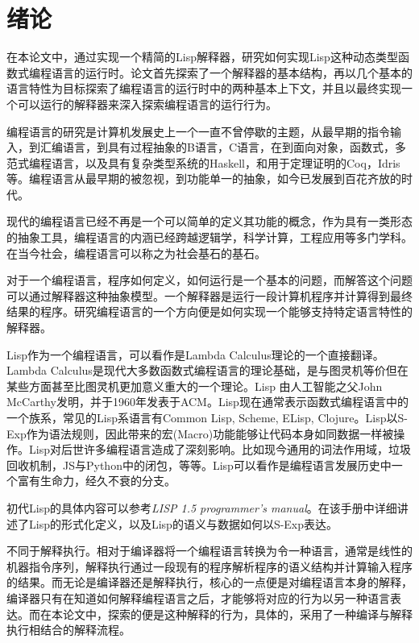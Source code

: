 %
%
{
    \let\centering\raggedright
    \chapter*{绪论}
}
\label{ch:intro}
\thispagestyle{hubu@thesis}

在本论文中，通过实现一个精简的Lisp解释器，研究如何实现Lisp这种动态类型函数式编程语言的运行时。论文首先探索了一个解释器的基本结构，再以几个基本的语言特性为目标探索了编程语言的运行时中的两种基本上下文，并且以最终实现一个可以运行的解释器来深入探索编程语言的运行行为。

编程语言的研究是计算机发展史上一个一直不曾停歇的主题，从最早期的指令输入，到汇编语言，到具有过程抽象的B语言，C语言，在到面向对象，函数式，多范式编程语言，以及具有复杂类型系统的Haskell，和用于定理证明的Coq，Idris等。编程语言从最早期的被忽视，到功能单一的抽象，如今已发展到百花齐放的时代。

现代的编程语言已经不再是一个可以简单的定义其功能的概念，作为具有一类形态的抽象工具，编程语言的内涵已经跨越逻辑学，科学计算，工程应用等多门学科。在当今社会，编程语言可以称之为社会基石的基石。

对于一个编程语言，程序如何定义，如何运行是一个基本的问题，而解答这个问题可以通过解释器这种抽象模型。一个解释器是运行一段计算机程序并计算得到最终结果的程序。研究编程语言的一个方向便是如何实现一个能够支持特定语言特性的解释器。

Lisp作为一个编程语言，可以看作是Lambda Calculus\cite{Church1932A}理论的一个直接翻译。Lambda Calculus是现代大多数函数式编程语言的理论基础，是与图灵机等价但在某些方面甚至比图灵机更加意义重大的一个理论。Lisp 由人工智能之父John McCarthy发明，并于1960年发表于ACM\cite{mccarthy60}。Lisp现在通常表示函数式编程语言中的一个族系，常见的Lisp系语言有Common Lisp, Scheme\cite{sussman1998scheme}, ELisp\cite{Lewis1993elisp}, Clojure\cite{hickey2008clj}。Lisp以S-Exp作为语法规则，因此带来的宏(Macro)功能能够让代码本身如同数据一样被操作。Lisp对后世许多编程语言造成了深刻影响。比如现今通用的词法作用域，垃圾回收机制，JS与Python中的闭包，等等。Lisp可以看作是编程语言发展历史中一个富有生命力，经久不衰的分支。

初代Lisp的具体内容可以参考\textit{LISP 1.5 programmer's manual}\cite{lisp1.5}。在该手册中详细讲述了Lisp的形式化定义，以及Lisp的语义与数据如何以S-Exp表达。

不同于解释执行。相对于编译器将一个编程语言转换为令一种语言，通常是线性的机器指令序列，解释执行通过一段现有的程序解析程序的语义结构并计算输入程序的结果。而无论是编译器还是解释执行，核心的一点便是对编程语言本身的解释，编译器只有在知道如何解释编程语言之后，才能够将对应的行为以另一种语言表达。而在本论文中，探索的便是这种解释的行为，具体的，采用了一种编译与解释执行相结合的解释流程。


